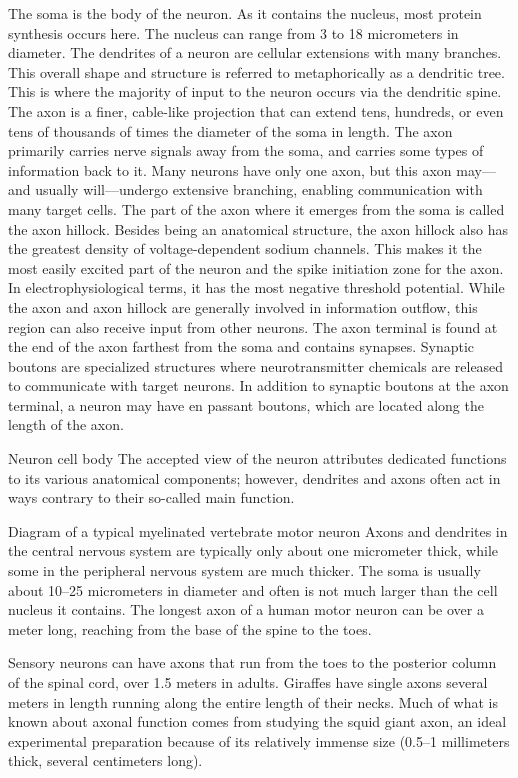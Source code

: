 The soma is the body of the neuron. As it contains the nucleus, most protein synthesis occurs here. The nucleus can range from 3 to 18 micrometers in diameter.
The dendrites of a neuron are cellular extensions with many branches. This overall shape and structure is referred to metaphorically as a dendritic tree. This is where the majority of input to the neuron occurs via the dendritic spine.
The axon is a finer, cable-like projection that can extend tens, hundreds, or even tens of thousands of times the diameter of the soma in length. The axon primarily carries nerve signals away from the soma, and carries some types of information back to it. Many neurons have only one axon, but this axon may---and usually will---undergo extensive branching, enabling communication with many target cells. The part of the axon where it emerges from the soma is called the axon hillock. Besides being an anatomical structure, the axon hillock also has the greatest density of voltage-dependent sodium channels. This makes it the most easily excited part of the neuron and the spike initiation zone for the axon. In electrophysiological terms, it has the most negative threshold potential.
While the axon and axon hillock are generally involved in information outflow, this region can also receive input from other neurons.
The axon terminal is found at the end of the axon farthest from the soma and contains synapses. Synaptic boutons are specialized structures where neurotransmitter chemicals are released to communicate with target neurons. In addition to synaptic boutons at the axon terminal, a neuron may have en passant boutons, which are located along the length of the axon.

Neuron cell body
The accepted view of the neuron attributes dedicated functions to its various anatomical components; however, dendrites and axons often act in ways contrary to their so-called main function.

Diagram of a typical myelinated vertebrate motor neuron
Axons and dendrites in the central nervous system are typically only about one micrometer thick, while some in the peripheral nervous system are much thicker. The soma is usually about 10--25 micrometers in diameter and often is not much larger than the cell nucleus it contains. The longest axon of a human motor neuron can be over a meter long, reaching from the base of the spine to the toes.

Sensory neurons can have axons that run from the toes to the posterior column of the spinal cord, over 1.5 meters in adults. Giraffes have single axons several meters in length running along the entire length of their necks. Much of what is known about axonal function comes from studying the squid giant axon, an ideal experimental preparation because of its relatively immense size (0.5--1 millimeters thick, several centimeters long).

